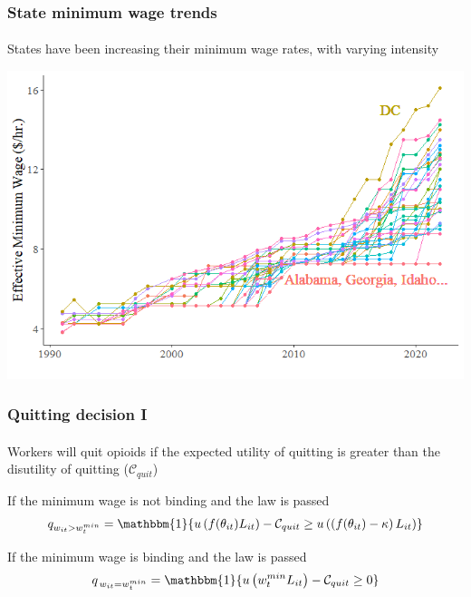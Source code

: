 \begin{frame}

    \label{min_wage_plot_allstates}
    
    \frametitle{State minimum wage trends} %
    \framesubtitle{}  %
    \rmfamily %
    
    \begin{wideitemize}
        \item States have been increasing their \textcolor{fblu}{minimum wage rates}, with varying intensity
    \end{wideitemize}

    \begin{center}
        \includegraphics[scale=0.5]{min_wage_plot.png}
    \end{center}
    
    \hyperlink{main_idea}{}
    
\end{frame}

\begin{frame}

    \label{quitting}
    \frametitle{Quitting decision I} %
    \framesubtitle{}  %
    \rmfamily %

    \begin{wideitemize}
        \item Workers will quit opioids \textcolor{fblu}{if the expected utility of quitting is greater than the disutility of quitting} (\(\mathcal{C}_{quit}\))
        \item If the \textcolor{fblu}{minimum wage is not binding} and \textcolor{fblu}{the law is passed}
        \[
        q_{w_{it} > w^{min}_t} = \mathbbm{1}\{u\left(f(\theta_{it})L_{it}\right) - \mathcal{C}_{quit} \geq u\left(\left(f(\theta_{it}) - \kappa\right)L_{it}\right)\}
        \]
        \vspace{-15pt}
        \item If the \textcolor{fblu}{minimum wage is binding} and \textcolor{fblu}{the law is passed}
        \[
        q_{\,w_{it} = w^{min}_t} = \mathbbm{1}\{u\left(w^{min}_tL_{it}\right) - \mathcal{C}_{quit} \geq 0\}
        \]
    \end{wideitemize}
    
    \hyperlink{decision_making}{}    

\end{frame}


